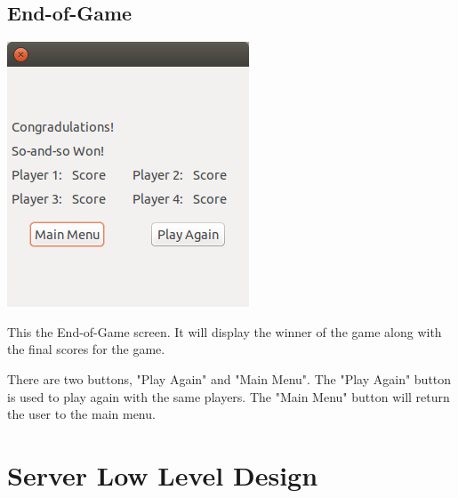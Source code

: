 \documentclass[]{scrartcl}
\begin{document}
\subsection{End-of-Game}
\centerline{\includegraphics{end_game.png}}
This the End-of-Game screen. It will display the winner of the game along with the final scores for the game.

 There are two buttons, "Play Again" and "Main Menu". The "Play Again" button is used to play again with the same players. The "Main Menu" button will return the user to the main menu.
 



 \newpage
 \noindent{}

 \section{Server Low Level Design}
\end{document}
